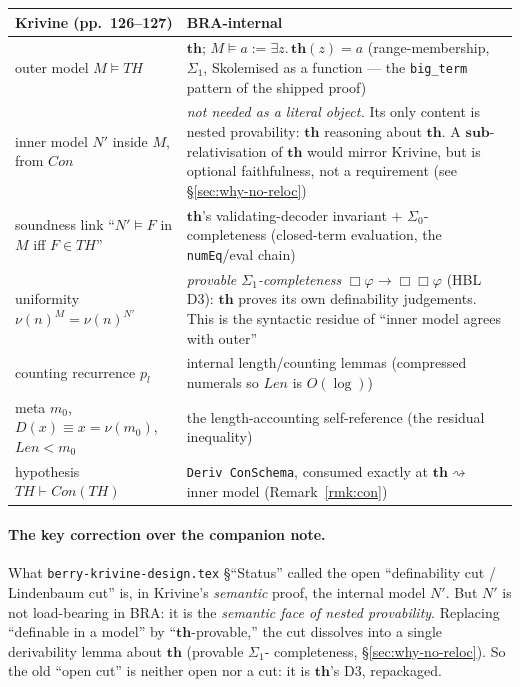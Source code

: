 \documentclass[11pt]{article}
\theoremstyle{plain}
\theoremstyle{definition}
\theoremstyle{remark}
\newcommand{\Con}{\mathit{Con}}
\newcommand{\Len}{\mathit{Len}}
\newcommand{\Thy}{\mathit{TH}}
\newcommand{\thmT}{\mathbf{th}}
\newcommand{\sub}{\mathbf{sub}}
\newcommand{\sat}{\models}
\begin{document}
\begin{center}
\begin{tabular}{p{}p{}}
\hline
\textbf{Krivine (pp.~126--127)} & \textbf{BRA-internal} \\
\hline
outer model $M\sat\Thy$
  & $\thmT$; \quad $M\sat a := \exists z.\,\thmT(z)=a$
    (range-membership, $\Sigma_1$, Skolemised as a function --- the
    \texttt{big\_term} pattern of the shipped proof) \\[2pt]
inner model $N'$ inside $M$, from $\Con$
  & \emph{not needed as a literal object.}  Its only content is nested
    provability: $\thmT$ reasoning about $\thmT$.  A $\sub$-relativisation
    of $\thmT$ would mirror Krivine, but is optional faithfulness, not a
    requirement (see {\S}\ref{sec:why-no-reloc}) \\[2pt]
soundness link ``$N'\sat F$ in $M$ iff $F\in\Thy$''
  & $\thmT$'s validating-decoder invariant $+$ $\Sigma_0$-completeness
    (closed-term evaluation, the \texttt{numEq}/eval chain) \\[2pt]
uniformity $\nu(n)^M=\nu(n)^{N'}$
  & \emph{provable $\Sigma_1$-completeness} $\Box\varphi\to\Box\Box\varphi$
    (HBL\,D3): $\thmT$ proves its own definability judgements.  This is
    the syntactic residue of ``inner model agrees with outer'' \\[2pt]
counting recurrence $p_l$
  & internal length/counting lemmas (compressed numerals so $\Len$ is
    $O(\log)$) \\[2pt]
meta $m_0$, $D(x)\equiv x{=}\nu(m_0)$, $\Len<m_0$
  & the length-accounting self-reference (the residual inequality) \\[2pt]
hypothesis $\Thy\vdash\Con(\Thy)$
  & \texttt{Deriv ConSchema}, consumed exactly at $\thmT\!\rightsquigarrow\!$
    inner model (Remark~\ref{rmk:con}) \\
\hline
\end{tabular}
\end{center}

\paragraph{The key correction over the companion note.}  What
\texttt{berry-krivine-design.tex} {\S}``Status'' called the open
``definability cut / Lindenbaum cut'' is, in Krivine's \emph{semantic}
proof, the internal model $N'$.  But $N'$ is not load-bearing in BRA: it
is the \emph{semantic face of nested provability}.  Replacing
``definable in a model'' by ``$\thmT$-provable,'' the cut dissolves into
a single derivability lemma about $\thmT$ (provable $\Sigma_1$-
completeness, {\S}\ref{sec:why-no-reloc}).  So the old ``open cut'' is
neither open nor a cut: it is $\thmT$'s D3, repackaged.
\end{document}
